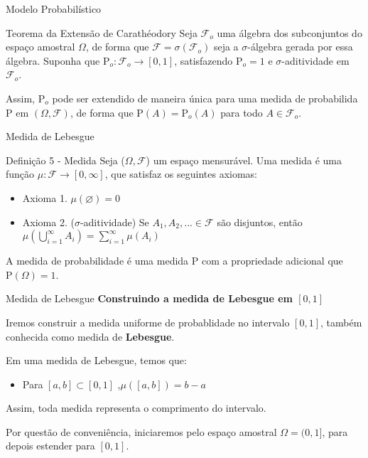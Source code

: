 \documentclass[10pt]{beamer}
\begin{document}
\begin{frame}[fragile]{Modelo Probabilístico}
\begin{block}{Teorema da Extensão de Carathéodory}
Seja $\mathcal{F}_o$ uma álgebra dos subconjuntos do espaço amostral $\Omega$,
de forma que $\mathcal{F}=\sigma(\mathcal{F}_o)$ seja a $\sigma$-álgebra gerada
por essa álgebra. Suponha que $\mathrm{P}_o:\mathcal{F}_o\rightarrow[0,1]$,
satisfazendo $\mathrm{P}_o=1$ e $\sigma$-aditividade em $\mathcal{F}_o$.

Assim, $\mathrm{P}_o$ pode ser extendido de maneira única para uma medida de probabilida $\mathrm{P}$ em $(\Omega,\mathcal{F})$, de forma que $\mathrm{P}(A)=
\mathrm{P}_o(A)$ para todo $A \in \mathcal{F}_o$.
\end{block}
\end{frame}

\begin{frame}[fragile]{Medida de Lebesgue}
\begin{block}{Definição 5 - Medida }
Seja ($\Omega, \mathcal{F}$) um espaço mensurável. Uma medida é uma função $\mu: \mathcal{F}\rightarrow[0,\infty]$, que satisfaz os seguintes axiomas:
\begin{itemize}
    \item Axioma 1. \quad $\mu(\varnothing)=0$
    \item Axioma 2. ($\sigma$-aditividade) Se $A_1, A_2,... \in \mathcal{F}$ são disjuntos, então $\mu(\bigcup\limits_{i=1}^{\infty} A_{i})=\sum_{i=1}^{\infty} \mu(A_i)$
\end{itemize}
A medida de probabilidade é uma medida $\mathrm{P}$ com a propriedade adicional que $\mathrm{P}(\Omega)=1$.
\end{block}
\end{frame}

\begin{frame}[fragile]{Medida de Lebesgue}
\textbf{Construindo a medida de Lebesgue em $[0,1]$}

Iremos construir a medida uniforme de probablidade no intervalo $[0,1]$, também conhecida como medida de \textbf{Lebesgue}.

Em uma medida de Lebesgue, temos que:

\begin{itemize}
\item Para $[a,b] \subset [0,1]$ ,\quad $\mu([a,b])=b-a$

\end{itemize} 
Assim, toda medida representa o comprimento do intervalo.

Por questão de conveniência, iniciaremos pelo espaço amostral $\Omega=(0,1]$, para depois estender para $[0,1]$.

\end{frame}
\end{document}
